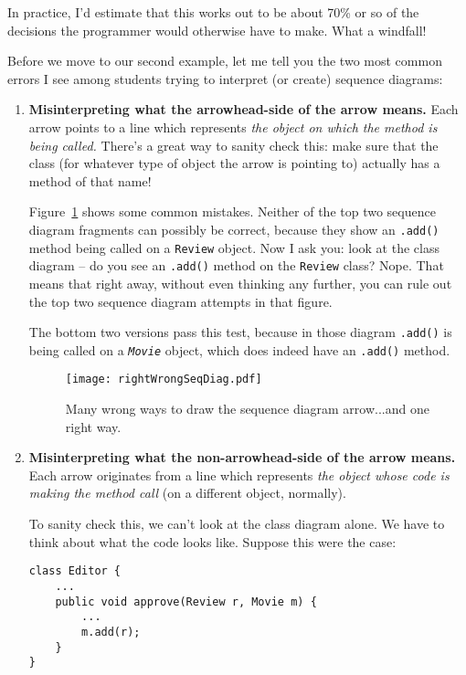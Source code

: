 In practice, I'd estimate that this works out to be about 70\% or so of the
decisions the programmer would otherwise have to make. What a windfall!

Before we move to our second example, let me tell you the two most common
errors I see among students trying to interpret (or create) sequence diagrams:

\vspace{-.1in}
\begin{enumerate}
\itemsep.5em
\item \textbf{Misinterpreting what the arrowhead-side of the arrow means.}
Each arrow points to a line which represents \textit{the object on which the
method is being called.} There's a great way to sanity check this: make sure
that the class (for whatever type of object the arrow is pointing to) actually
has a method of that name!

Figure~\ref{fig:rightWrongSeqDiag} shows some common mistakes. Neither of the
top two sequence diagram fragments can possibly be correct, because they show
an \texttt{.add()} method being called on a \texttt{Review} object. Now I ask
you: look at the class diagram -- do you see an \texttt{.add()} method on the
\texttt{Review} class? Nope. That means that right away, without even thinking
any further, you can rule out the top two sequence diagram attempts in that
figure.

The bottom two versions pass this test, because in those diagram
\texttt{.add()} is being called on a \textit{\texttt{Movie}} object, which
does indeed have an \texttt{.add()} method.

\begin{figure}
\centering
\texttt{[image: rightWrongSeqDiag.pdf]}  %
\caption{Many wrong ways to draw the sequence diagram arrow...and one right
way.}
\label{fig:rightWrongSeqDiag}
\end{figure}

\item \textbf{Misinterpreting what the non-arrowhead-side of the arrow means.}
Each arrow originates from a line which represents \textit{the object whose
code is making the method call} (on a different object, normally). 

To sanity check this, we can't look at the class diagram alone. We have to
think about what the code looks like. Suppose this were the case:

\begin{Verbatim}[fontsize=\small,samepage=true,frame=single]
class Editor {
    ...
    public void approve(Review r, Movie m) {
        ...
        m.add(r);
    }
}
\end{Verbatim}


\end{enumerate}
